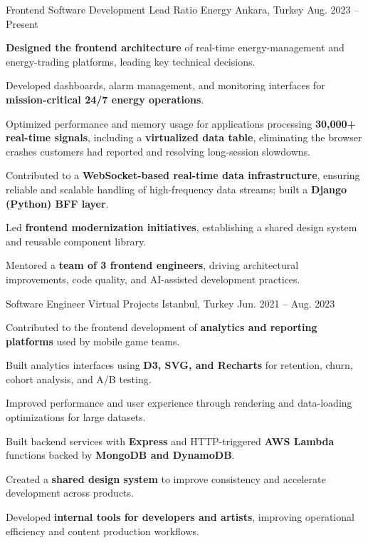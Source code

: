 \begin{cventries}

\cventry
{Frontend Software Development Lead}
{Ratio Energy}
{Ankara, Turkey}
{Aug. 2023 -- Present}
{\begin{cvitems}
\item {\textbf{Designed the frontend architecture} of real-time energy-management and energy-trading platforms, leading key technical decisions.}
\item {Developed dashboards, alarm management, and monitoring interfaces for \textbf{mission-critical 24/7 energy operations}.}
\item {Optimized performance and memory usage for applications processing \textbf{30,000+ real-time signals}, including a \textbf{virtualized data table}, eliminating the browser crashes customers had reported and resolving long-session slowdowns.}
\item {Contributed to a \textbf{WebSocket-based real-time data infrastructure}, ensuring reliable and scalable handling of high-frequency data streams; built a \textbf{Django (Python) BFF layer}.}
\item {Led \textbf{frontend modernization initiatives}, establishing a shared design system and reusable component library.}
\item {Mentored a \textbf{team of 3 frontend engineers}, driving architectural improvements, code quality, and AI-assisted development practices.}
\end{cvitems}}

\cventry
{Software Engineer}
{Virtual Projects}
{Istanbul, Turkey}
{Jun. 2021 -- Aug. 2023}
{\begin{cvitems}
\item {Contributed to the frontend development of \textbf{analytics and reporting platforms} used by mobile game teams.}
\item {Built analytics interfaces using \textbf{D3, SVG, and Recharts} for retention, churn, cohort analysis, and A/B testing.}
\item {Improved performance and user experience through rendering and data-loading optimizations for large datasets.}
\item {Built backend services with \textbf{Express} and HTTP-triggered \textbf{AWS Lambda} functions backed by \textbf{MongoDB and DynamoDB}.}
\item {Created a \textbf{shared design system} to improve consistency and accelerate development across products.}
\item {Developed \textbf{internal tools for developers and artists}, improving operational efficiency and content production workflows.}
\end{cvitems}}


\end{cventries}

